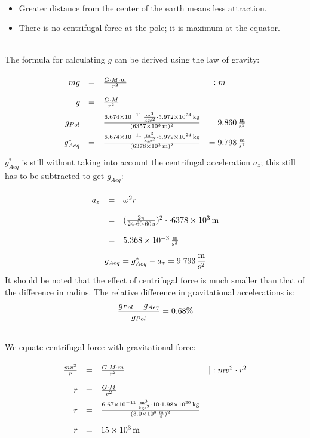 \documentclass[a4paper]{article}
\begin{document}
	\vspace{0.5 cm}
	
	\\
	\begin{itemize}
		\item Greater distance from the center of the earth means less attraction.
		\item There is no centrifugal force at the pole; it is maximum at the equator.
	\end{itemize}
	\vspace{0.5 cm}
	
	\\
	The formula for calculating $g$ can be derived using the law of gravity:
	$$
	\renewcommand{\arraystretch}{2}
	\begin{array}{rcll}
		m g &=& {G \cdot M \cdot m \over r^2} &|:m \\
		g &=& {G \cdot M \over r^2} \\
		g_{Pol} &=& {\SI{6.674e-11}{{\meter^3} \over {\kilogram\second^2}} \cdot\SI{5.972e24}{\kilogram} \over ({ \SI{6357e3}{\meter}})^2 }&=\SI{9,860}{\meter \over{ \second^2}}\\
		g_{Aeq}^* &=& {\SI{6.674e-11}{{\meter^3} \over {\kilogram\second^2}} \cdot\SI{5.972e24}{\kilogram} \over ({\SI{6378e3}{\meter}})^2 }&=\SI{9,798}{\meter \over{ \second^2}}\\
	\end{array}
	$$
	$g_{Aeq}^*$ is still without taking into account the centrifugal acceleration $a_z$; this still has to be subtracted to get $g_{Aeq}$:
	$$
	\renewcommand{\arraystretch}{2}
	\begin{array}{rcll}
		a_z &=& {\omega^2 r}\\
		&=& ({2 \pi \over 24 \cdot 60 \cdot \SI{60}{\second}})^2 \cdot \cdot\SI{6378e3}{\meter}\\
		&=& \SI{5,368e-3}{\meter \over{ \second^2}}
	\end{array}
	$$
	$$g_{Aeq} = g_{Aeq}^* - a_z = \SI{9,793}{\meter \over{ \second^2}}$$
	It should be noted that the effect of centrifugal force is much smaller than that of the difference in radius.
	The relative difference in gravitational accelerations is:
	$${g_{Pol}-g_{Aeq}\over g_{Pol}}=0.68\%$$
	\vspace{0.5 cm}
	
	\\
	We equate centrifugal force with gravitational force:
	$$
	\renewcommand{\arraystretch}{2}
	\begin{array}{rcll}
		{m v^2 \over r} &=& {G \cdot M \cdot m \over r^2} &|:m v^2 \cdot r^2 \\
		r &=& { G \cdot M \over v^2}\\
		r &=& { \SI{6.67e-11}{{\meter^3} \over {\kilogram\second^2}} \cdot 10 \cdot\SI{1.98e30}{\kilogram} \over (\SI{3,0e8}{\meter\over \second})^2} \\
		r &=& \SI{15e3}{\meter}
	\end{array}
	$$
	\vspace{0.5 cm}
	
\end{document}
